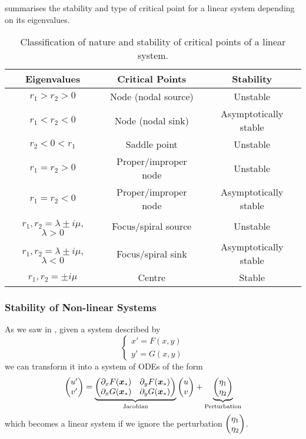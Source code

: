  summarises the stability and type of critical point for a linear system depending on its eigenvalues.

\begin{table}[H]
	\begin{center}
		\begin{tabular}{c|c|c}
			Eigenvalues & Critical Points & Stability \\
			\hline
			$r_1 > r_2 > 0$ & Node (nodal source) & Unstable \\
			$r_1 < r_2 < 0$ & Node (nodal sink) & Asymptotically stable \\
			$r_2 < 0 < r_1$ & Saddle point & Unstable \\
			$r_1 = r_2 > 0$ & Proper/improper node & Unstable \\
			$r_1 = r_2 < 0$ & Proper/improper node & Asymptotically stable \\
			$r_1,r_2 = \lambda \pm i\mu$, $\lambda>0$ & Focus/spiral source & Unstable \\
			$r_1,r_2 = \lambda \pm i\mu$, $\lambda<0$ & Focus/spiral sink & Asymptotically stable \\
			$r_1,r_2 = \pm i\mu$ & Centre & Stable \\
		\end{tabular}
	\end{center}
	\caption{Classification of nature and stability of critical points of a linear system.}
	\label{table:stability}
\end{table}

\subsubsection{Stability of Non-linear Systems}

As we saw in , given a system described by
\[
\begin{cases}
	x' = F(x,y) \\
	y' = G(x,y)
\end{cases}
\]
we can transform it into a system of ODEs of the form
\[
\begin{pmatrix}u'\\v'\end{pmatrix} = \underbrace{\begin{pmatrix}\partial_x F(\bm{x}_{\ast}) & \partial_y F(\bm{x}_{\ast}) \\ \partial_x G(\bm{x}_{\ast}) & \partial_y G(\bm{x}_{\ast})\end{pmatrix}}_{\text{Jacobian}} \begin{pmatrix}u\\v\end{pmatrix} + \underbrace{\begin{pmatrix}\eta_1 \\ \eta_2\end{pmatrix}}_{\text{Perturbation}}
\]
which becomes a linear system if we ignore the perturbation $\begin{pmatrix}\eta_1 \\ \eta_2\end{pmatrix}$.

